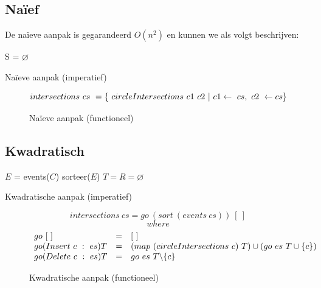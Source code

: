 \documentclass[12pt,a4paper]{article}
\begin{document}
\subsection{Na\"ief}
\label{sec:naief}

De naïeve aanpak is gegarandeerd $O(n^2)$ en kunnen we als volgt beschrijven:

\begin{algorithm}[H]
  S = $\varnothing$\;
 \caption{Na\"ieve aanpak (imperatief)}
\end{algorithm}

\begin{figure}
\[
intersections\ cs\ = \{\ circleIntersections\ c1\ c2\ |\ c1 \leftarrow\ cs,\ c2\ \leftarrow\\ cs \}
\]
\label{naief_functioneel}
\caption{Na\"ieve aanpak (functioneel)}
\end{figure}


\subsection{Kwadratisch}
\label{sec:kwadratisch}
\begin{algorithm}[H]
  $E$ = events($C$)\;
  sorteer($E$)\;
  $T = R = \varnothing$\;
 \caption{Kwadratische aanpak (imperatief)}
\end{algorithm}

\begin{figure}
\[
intersections\ cs = go\ (sort\ (events\ cs))\ [\ ]
\]
\[
where 
\]
\[
\begin{array}{l c l}
go\ [\ ] &= &[\ ]\\
go (Insert\ c\ :\ es) T &= &(map\ (circleIntersections\ c)\ T) \cup (go\ es\ T\cup\{c\})\\
go (Delete\ c\ :\ es) T &= &go\ es\ T\backslash\{c\}\\
\end{array}
\]
\label{naief_functioneel}
\caption{Kwadratische aanpak (functioneel)}
\end{figure}
\end{document}
